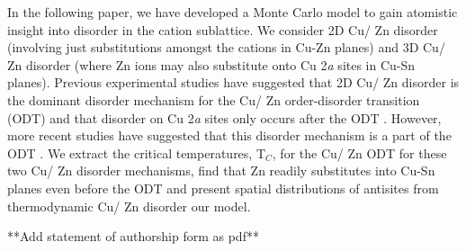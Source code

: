 \documentclass[11pt, twoside]{report}
\begin{document}
In the following paper, we have developed a Monte Carlo model to gain atomistic insight into disorder in the cation sublattice. We consider 2D Cu/ Zn disorder (involving just substitutions amongst the cations in Cu-Zn planes) and 3D Cu/ Zn disorder (where Zn ions may also substitute onto Cu 2\textit{a} sites in Cu-Sn planes). 
Previous experimental studies have suggested that 2D Cu/ Zn disorder is the dominant disorder mechanism for the Cu/ Zn order-disorder transition (ODT) and that disorder on Cu 2\textit{a} sites only occurs after the ODT \cite{disorder_july}. However, more recent studies have suggested that this disorder mechanism is a part of the ODT \cite{Cu2a_expt, Cu2a_theory}.
We extract the critical temperatures, T$_C$, for the Cu/ Zn ODT for these two Cu/ Zn disorder mechanisms, find that Zn readily substitutes into Cu-Sn planes even before the ODT and present spatial distributions of antisites from thermodynamic Cu/ Zn disorder our model.

**Add statement of authorship form as pdf**

\end{document}
